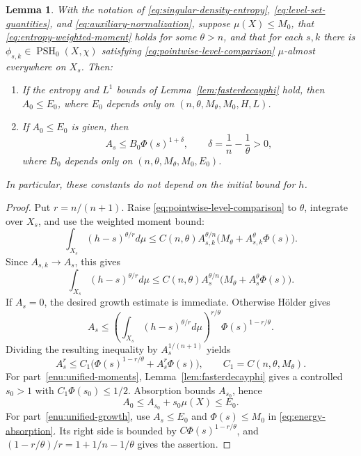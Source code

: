 \documentclass[oneside,english,letterpaper]{amsart}
\numberwithin{equation}{section}
\theoremstyle{plain}
\newtheorem{lem}[thm]{Lemma}
\theoremstyle{definition}
\theoremstyle{remark}
\begin{document}
\begin{lem}
	\label{lem:energygrowth-unified}
	With the notation of \eqref{eq:singular-density-entropy},
	\eqref{eq:level-set-quantities}, and
	\eqref{eq:auxiliary-normalization}, suppose
	$\mu(X)\leq M_0$, that \eqref{eq:entropy-weighted-moment}
	holds for some $\theta>n$, and that for each $s,k$ there is
	$\phi_{s,k}\in\operatorname{PSH}_0(X,\chi)$ satisfying
	\eqref{eq:pointwise-level-comparison} $\mu$-almost everywhere on $X_s$.
	Then:
	\begin{enumerate}[label=\textnormal{(\roman*)}]
		\item\label{enu:unified-moments}
		If the entropy and $L^1$ bounds of Lemma~\ref{lem:fasterdecayphi}
		hold, then $A_0\leq E_0$, where $E_0$ depends only on
		$(n,\theta,M_\theta,M_0,H,L)$.
		\item\label{enu:unified-growth}
		If $A_0\leq E_0$ is given, then
		\begin{equation}
			\label{eq:energy-and-level-growth}
			A_s\leq B_0\Phi(s)^{1+\delta},\qquad
			\delta=\frac1n-\frac1\theta>0,
		\end{equation}
		where $B_0$ depends only on $(n,\theta,M_\theta,M_0,E_0)$.
	\end{enumerate}
	In particular, these constants do not depend on the initial bound for $h$.
\end{lem}


\begin{proof}
	Put $r=n/(n+1)$. Raise \eqref{eq:pointwise-level-comparison} to
	$\theta$, integrate over $X_s$, and use the weighted moment bound:
	\[
	\int_{X_s}(h-s)^{\theta/r}d\mu
	\leq C(n,\theta)A_{s,k}^{\theta/n}
	\bigl(M_\theta+A_{s,k}^\theta\Phi(s)\bigr).
	\]
	Since $A_{s,k}\to A_s$, this gives
	\begin{equation}
		\label{eq:level-high-moment}
		\int_{X_s}(h-s)^{\theta/r}d\mu
		\leq C(n,\theta)A_s^{\theta/n}
		\bigl(M_\theta+A_s^\theta\Phi(s)\bigr).
	\end{equation}
	If $A_s=0$, the desired growth estimate is immediate. Otherwise
	H\"older gives
	\[
	A_s\leq\left(\int_{X_s}(h-s)^{\theta/r}d\mu\right)^{r/\theta}
	\Phi(s)^{1-r/\theta}.
	\]
	Dividing the resulting inequality by $A_s^{1/(n+1)}$ yields
	\begin{equation}
		\label{eq:energy-absorption}
		A_s^r\leq C_1\bigl(\Phi(s)^{1-r/\theta}+A_s^r\Phi(s)\bigr),
		\qquad C_1=C(n,\theta,M_\theta).
	\end{equation}
	For part~\ref{enu:unified-moments}, Lemma~\ref{lem:fasterdecayphi}
	gives a controlled $s_0>1$ with
	$C_1\Phi(s_0)\leq1/2$. Absorption bounds $A_{s_0}$, hence
	\[
	A_0\leq A_{s_0}+s_0\mu(X)\leq E_0.
	\]
	For part~\ref{enu:unified-growth}, use $A_s\leq E_0$ and
	$\Phi(s)\leq M_0$ in \eqref{eq:energy-absorption}. Its right side
	is bounded by $C\Phi(s)^{1-r/\theta}$, and
	$(1-r/\theta)/r=1+1/n-1/\theta$ gives the assertion.
\end{proof}
\end{document}
